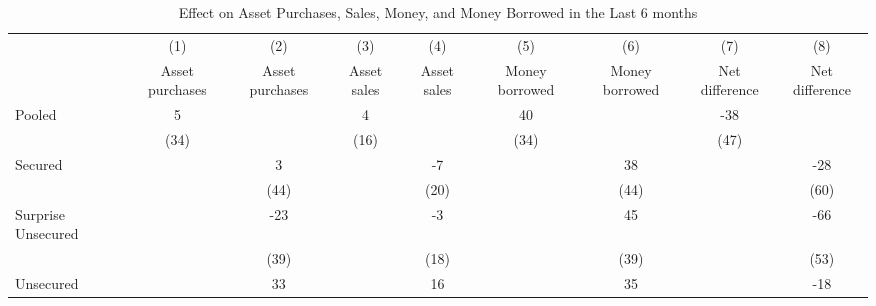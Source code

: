 \begin{table}[htbp]\centering
\def\sym#1{\ifmmode^{#1}\else\(^{#1}\)\fi}
\caption{Effect on Asset Purchases, Sales, Money, and Money Borrowed in the Last 6 months\label{assets99\_lvl\_ITT\_v2}}
\begin{tabular}{l*{8}{c}}
\toprule
                    &\multicolumn{1}{c}{(1)}&\multicolumn{1}{c}{(2)}&\multicolumn{1}{c}{(3)}&\multicolumn{1}{c}{(4)}&\multicolumn{1}{c}{(5)}&\multicolumn{1}{c}{(6)}&\multicolumn{1}{c}{(7)}&\multicolumn{1}{c}{(8)}\\
                    &\multicolumn{1}{c}{Asset purchases}&\multicolumn{1}{c}{Asset purchases}&\multicolumn{1}{c}{Asset sales}&\multicolumn{1}{c}{Asset sales}&\multicolumn{1}{c}{Money borrowed}&\multicolumn{1}{c}{Money borrowed}&\multicolumn{1}{c}{Net difference}&\multicolumn{1}{c}{Net difference}\\
\midrule
Pooled              &           5         &                     &           4         &                     &          40         &                     &         -38         &                     \\
                    &        (34)         &                     &        (16)         &                     &        (34)         &                     &        (47)         &                     \\\addlinespace
Secured             &                     &           3         &                     &          -7         &                     &          38         &                     &         -28         \\
                    &                     &        (44)         &                     &        (20)         &                     &        (44)         &                     &        (60)         \\\addlinespace
Surprise Unsecured  &                     &         -23         &                     &          -3         &                     &          45         &                     &         -66         \\
                    &                     &        (39)         &                     &        (18)         &                     &        (39)         &                     &        (53)         \\\addlinespace
Unsecured           &                     &          33         &                     &          16         &                     &          35         &                     &         -18         \\

\end{tabular}
\end{table}
